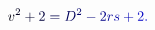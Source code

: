 \documentclass[12pt]{article}
\begin{document}
\makeatletter
\renewcommand*{\@textcolor}[3]{%
  \protect\leavevmode
  \begingroup
    \color#1{#2}#3%
  \endgroup
}
\makeatother
\begin{displaymath}
\mathcolor[RGB]{0,0,15}{v} ^ { \mathcolor[RGB]{0,0,30}{2} } \mathcolor[RGB]{0,0,45}{+} \mathcolor[RGB]{0,0,60}{2} \mathcolor[RGB]{0,0,75}{=} \mathcolor[RGB]{0,0,90}{D} ^ { \mathcolor[RGB]{0,0,105}{2} } \mathcolor[RGB]{0,0,120}{-} \mathcolor[RGB]{0,0,135}{2} \mathcolor[RGB]{0,0,150}{r} \mathcolor[RGB]{0,0,165}{s} \mathcolor[RGB]{0,0,180}{+} \mathcolor[RGB]{0,0,195}{2} \mathcolor[RGB]{0,0,210}{.}
\end{displaymath}
\end{document}

